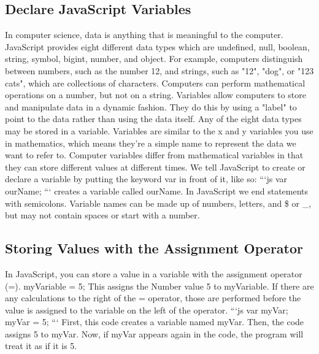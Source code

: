 \documentclass{article}%
\begin{document}
\subsection{Declare JavaScript Variables}%
\label{subsec:DeclareJavaScriptVariables}%
In computer science, data is anything that is meaningful to the computer. JavaScript provides eight different data types which are undefined, null, boolean, string, symbol, bigint, number, and object.\newline%
For example, computers distinguish between numbers, such as the number 12, and strings, such as "12", "dog", or "123 cats", which are collections of characters. Computers can perform mathematical operations on a number, but not on a string.\newline%
Variables allow computers to store and manipulate data in a dynamic fashion. They do this by using a "label" to point to the data rather than using the data itself. Any of the eight data types may be stored in a variable.\newline%
Variables are similar to the x and y variables you use in mathematics, which means they're a simple name to represent the data we want to refer to. Computer variables differ from mathematical variables in that they can store different values at different times.\newline%
We tell JavaScript to create or declare a variable by putting the keyword var in front of it, like so:\newline%
```js\newline%
var ourName;\newline%
```\newline%
creates a variable called ourName. In JavaScript we end statements with semicolons.\newline%
Variable names can be made up of numbers, letters, and \$ or \_, but may not contain spaces or start with a number.\newline%

%
\subsection{Storing Values with the Assignment Operator}%
\label{subsec:StoringValueswiththeAssignmentOperator}%
In JavaScript, you can store a value in a variable with the assignment operator (=). \newline%
myVariable = 5;\newline%
This assigns the Number value 5 to myVariable.\newline%
If there are any calculations to the right of the = operator, those are performed before the value is assigned to the variable on the left of the operator.\newline%
```js\newline%
var myVar;\newline%
myVar = 5;\newline%
```\newline%
First, this code creates a variable named myVar. Then, the code assigns 5 to myVar. Now, if myVar appears again in the code, the program will treat it as if it is 5.\newline%
\end{document}
